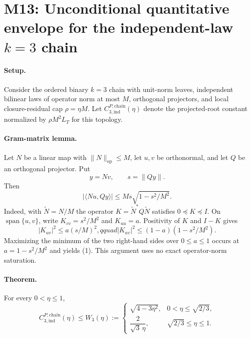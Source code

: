 \section*{M13: Unconditional quantitative envelope for the independent-law $k=3$ chain}
\label{sec:m13-unconditional-chain-envelope}

\paragraph{Setup.}
Consider the ordered binary $k=3$ chain with unit-norm leaves, independent
bilinear laws of operator norm at most $M$, orthogonal projectors, and local
closure-residual cap $\rho=\eta M$.  Let
$C_{3,\mathrm{ind}}^{P,\mathrm{chain}}(\eta)$ denote the projected-root
constant normalized by $\rho M^2L_T$ for this topology.

\paragraph{Gram-matrix lemma.}
Let $N$ be a linear map with $\|N\|_{\mathrm{op}}\le M$, let $u,v$ be
orthonormal, and let $Q$ be an orthogonal projector.  Put
\[
  y=Nv,\qquad s=\|Qy\|.
\]
Then
\[
  |\langle Nu,Qy\rangle|
  \le M s\sqrt{1-s^2/M^2}.
\tag{1}
\]
Indeed, with $\widetilde N=N/M$ the operator
$K=\widetilde N^*Q\widetilde N$ satisfies $0\preceq K\preceq I$.  On
$\operatorname{span}\{u,v\}$, write $K_{vv}=s^2/M^2$ and
$K_{uu}=a$.  Positivity of $K$ and $I-K$ gives
\[
 |K_{uv}|^2\le a(s/M)^2,qquad
 |K_{uv}|^2\le(1-a)(1-s^2/M^2).
\]
Maximizing the minimum of the two right-hand sides over $0\le a\le1$
occurs at $a=1-s^2/M^2$ and yields (1).  This argument uses no exact
operator-norm saturation.

\paragraph{Theorem.}
For every $0<\eta\le1$,
\[
 C_{3,\mathrm{ind}}^{P,\mathrm{chain}}(\eta)
 \le W_3(\eta):=
 \begin{cases}
 \sqrt{4-3\eta^2}, & 0<\eta\le\sqrt{2/3},\\[2mm]
 \dfrac{2}{\sqrt3\,\eta}, & \sqrt{2/3}\le\eta\le1.
 \end{cases}
\tag{2}
\]

